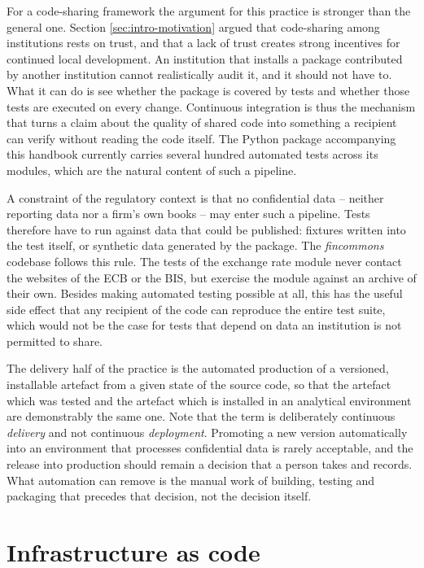 \documentclass[a4paper, 11pt]{report}
\begin{document}
For a code-sharing framework the argument for this practice is stronger than the general one. Section \ref{sec:intro-motivation} argued that code-sharing among institutions rests on trust, and that a lack of trust creates strong incentives for continued local development. An institution that installs a package contributed by another institution cannot realistically audit it, and it should not have to. What it can do is see whether the package is covered by tests and whether those tests are executed on every change. Continuous integration is thus the mechanism that turns a claim about the quality of shared code into something a recipient can verify without reading the code itself. The Python package accompanying this handbook currently carries several hundred automated tests across its modules, which are the natural content of such a pipeline.

A constraint of the regulatory context is that no confidential data -- neither reporting data nor a firm's own books -- may enter such a pipeline. Tests therefore have to run against data that could be published: fixtures written into the test itself, or synthetic data generated by the package. The \emph{fincommons} codebase follows this rule. The tests of the exchange rate module never contact the websites of the ECB or the BIS, but exercise the module against an archive of their own. Besides making automated testing possible at all, this has the useful side effect that any recipient of the code can reproduce the entire test suite, which would not be the case for tests that depend on data an institution is not permitted to share.

The delivery half of the practice is the automated production of a versioned, installable artefact from a given state of the source code, so that the artefact which was tested and the artefact which is installed in an analytical environment are demonstrably the same one. Note that the term is deliberately continuous \emph{delivery} and not continuous \emph{deployment}. Promoting a new version automatically into an environment that processes confidential data is rarely acceptable, and the release into production should remain a decision that a person takes and records. What automation can remove is the manual work of building, testing and packaging that precedes that decision, not the decision itself.

\section{Infrastructure as code}
\end{document}
